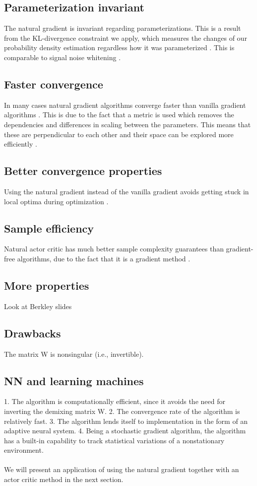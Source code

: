 \subsection{Parameterization invariant}
The natural gradient is invariant regarding parameterizations. This is a result from the KL-divergence constraint we apply, which measures the changes of our probability density estimation regardless how it was parameterized \cite{pascanu2013revisiting}. This is comparable to signal noise whitening \cite{sohl2012natural}.

\subsection{Faster convergence}
In many cases natural gradient algorithms converge faster than vanilla gradient algorithms \cite{sohl2012natural, amari1998natural}. This is due to the fact that a metric is used which removes the dependencies and differences in scaling between the parameters. This means that these are perpendicular to each other and their space can be explored more efficiently \cite{sohl2012natural}.

\subsection{Better convergence properties}
Using the natural gradient instead of the vanilla gradient avoids getting stuck in local optima during optimization \cite{amari1998natural}.

\subsection{Sample efficiency}
Natural actor critic has much better sample complexity guarantees than gradient-free algorithms, due to the fact that it is a gradient method \cite{nemirovski2005efficient}.

\subsection{More properties}
Look at Berkley slides

\subsection{Drawbacks}
The matrix W is nonsingular (i.e., invertible).

\subsection{NN and learning machines}
1. The algorithm is computationally efficient, since it avoids the need for inverting
the demixing matrix W.
2. The convergence rate of the algorithm is relatively fast.
3. The algorithm lends itself to implementation in the form of an adaptive neural system.
4. Being a stochastic gradient algorithm, the algorithm has a built-in capability to
track statistical variations of a nonstationary environment.
\\
\\
We will present an application of using the natural gradient together with an actor critic method in the next section.

